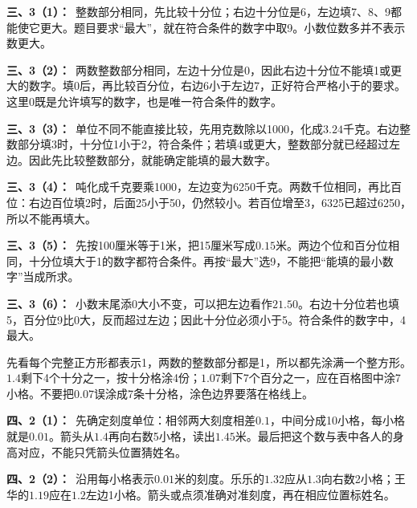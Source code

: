 \documentclass[multi=snippet,border=0pt]{standalone}
\newenvironment{snippet}[3]{\begin{minipage}{#1bp}\color{answerred}\fontsize{#2}{#3}\selectfont\raggedright}{\end{minipage}}
\begin{document}
\begin{snippet}{505}{11.5}{14}\textbf{三、3（1）：}\ 整数部分相同，先比较十分位；右边十分位是6，左边填7、8、9都能使它更大。题目要求“最大”，就在符合条件的数字中取9。小数位数多并不表示数更大。\end{snippet}
\begin{snippet}{505}{11.5}{14}\textbf{三、3（2）：}\ 两数整数部分相同，左边十分位是0，因此右边十分位不能填1或更大的数字。填0后，再比较百分位，右边6小于左边7，正好符合严格小于的要求。这里0既是允许填写的数字，也是唯一符合条件的数字。\end{snippet}
\begin{snippet}{505}{11.5}{14}\textbf{三、3（3）：}\ 单位不同不能直接比较，先用克数除以1000，化成\(3.24\)千克。右边整数部分填3时，十分位1小于2，符合条件；若填4或更大，整数部分就已经超过左边。因此先比较整数部分，就能确定能填的最大数字。\end{snippet}
\begin{snippet}{505}{11.5}{14}\textbf{三、3（4）：}\ 吨化成千克要乘1000，左边变为6250千克。两数千位相同，再比百位：右边百位填2时，后面25小于50，仍然较小。若百位增至3，6325已超过6250，所以不能再填大。\end{snippet}
\begin{snippet}{505}{11.5}{14}\textbf{三、3（5）：}\ 先按100厘米等于1米，把15厘米写成\(0.15\)米。两边个位和百分位相同，十分位填大于1的数字都符合条件。再按“最大”选9，不能把“能填的最小数字”当成所求。\end{snippet}
\begin{snippet}{505}{11.5}{14}\textbf{三、3（6）：}\ 小数末尾添0大小不变，可以把左边看作\(21.50\)。右边十分位若也填5，百分位9比0大，反而超过左边；因此十分位必须小于5。符合条件的数字中，4最大。\end{snippet}
\begin{snippet}{505}{11.5}{14}先看每个完整正方形都表示1，两数的整数部分都是1，所以都先涂满一个整方形。\(1.4\)剩下4个十分之一，按十分格涂4份；\(1.07\)剩下7个百分之一，应在百格图中涂7小格。不要把\(0.07\)误涂成7条十分格，涂色边界要落在格线上。\end{snippet}
\begin{snippet}{505}{11.5}{14}\textbf{四、2（1）：}\ 先确定刻度单位：相邻两大刻度相差\(0.1\)，中间分成10小格，每小格就是\(0.01\)。箭头从\(1.4\)再向右数5小格，读出\(1.45\)米。最后把这个数与表中各人的身高对应，不能只凭箭头位置猜姓名。\end{snippet}
\begin{snippet}{505}{11.5}{14}\textbf{四、2（2）：}\ 沿用每小格表示\(0.01\)米的刻度。乐乐的\(1.32\)应从\(1.3\)向右数2小格；王华的\(1.19\)应在\(1.2\)左边1小格。箭头或点须准确对准刻度，再在相应位置标姓名。\end{snippet}
\end{document}
